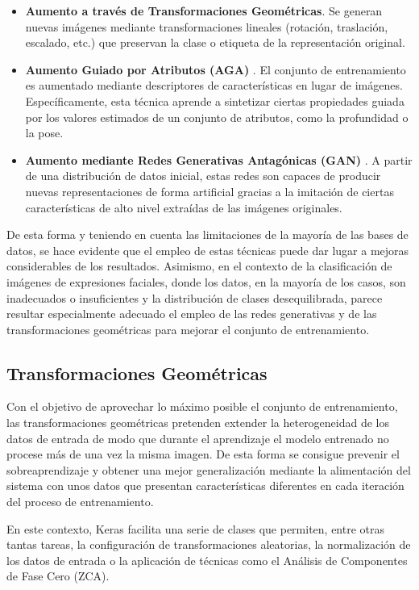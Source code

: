 \begin{itemize}
    \item \textbf{Aumento a través de Transformaciones Geométricas}. Se generan nuevas imágenes mediante transformaciones lineales (rotación, traslación, escalado, etc.) que preservan la clase o etiqueta de la representación original.
    \item \textbf{Aumento Guiado por Atributos (AGA)} \cite{AGA}. El conjunto de entrenamiento es aumentado mediante descriptores de características en lugar de imágenes. Específicamente, esta técnica aprende a sintetizar ciertas propiedades guiada por los valores estimados de un conjunto de atributos, como la profundidad o la pose.
    \item \textbf{Aumento mediante Redes Generativas Antagónicas (GAN)} \cite{GAN}. A partir de una distribución de datos inicial, estas redes son capaces de producir nuevas representaciones de forma artificial gracias a la imitación de ciertas características de alto nivel extraídas de las imágenes originales.
\end{itemize}

De esta forma y teniendo en cuenta las limitaciones de la mayoría de las bases de datos, se hace evidente que el empleo de estas técnicas puede dar lugar a mejoras considerables de los resultados. Asimismo, en el contexto de la clasificación de imágenes de expresiones faciales, donde los datos, en la mayoría de los casos, son inadecuados o insuficientes y la distribución de clases desequilibrada, parece resultar especialmente adecuado el empleo de las redes generativas y de las transformaciones geométricas para mejorar el conjunto de entrenamiento.

\subsection{Transformaciones Geométricas} \label{Chapter:GeometricTransformations}

Con el objetivo de aprovechar lo máximo posible el conjunto de entrenamiento, las transformaciones geométricas pretenden extender la heterogeneidad de los datos de entrada de modo que durante el aprendizaje el modelo entrenado no procese más de una vez la misma imagen. De esta forma se consigue prevenir el sobreaprendizaje y obtener una mejor generalización mediante la alimentación del sistema con unos datos que presentan características diferentes en cada iteración del proceso de entrenamiento.

En este contexto, Keras facilita una serie de clases que permiten, entre otras tantas tareas, la configuración de transformaciones aleatorias, la normalización de los datos de entrada o la aplicación de técnicas como el Análisis de Componentes de Fase Cero (ZCA).

